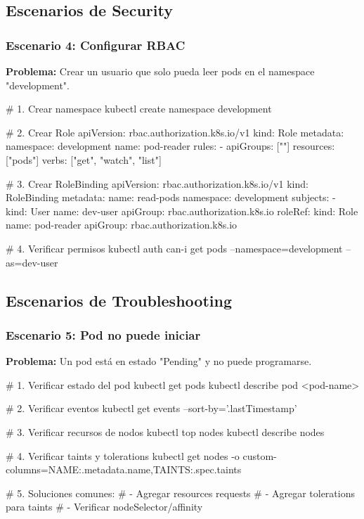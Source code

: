 \documentclass[11pt,a4paper]{article}
\begin{document}
\subsection{Escenarios de Security}

\subsubsection{Escenario 4: Configurar RBAC}

\textbf{Problema:} Crear un usuario que solo pueda leer pods en el namespace "development".

\begin{commandbox}
\# 1. Crear namespace
kubectl create namespace development

\# 2. Crear Role
apiVersion: rbac.authorization.k8s.io/v1
kind: Role
metadata:
  namespace: development
  name: pod-reader
rules:
- apiGroups: [""]
  resources: ["pods"]
  verbs: ["get", "watch", "list"]

\# 3. Crear RoleBinding
apiVersion: rbac.authorization.k8s.io/v1
kind: RoleBinding
metadata:
  name: read-pods
  namespace: development
subjects:
- kind: User
  name: dev-user
  apiGroup: rbac.authorization.k8s.io
roleRef:
  kind: Role
  name: pod-reader
  apiGroup: rbac.authorization.k8s.io

\# 4. Verificar permisos
kubectl auth can-i get pods --namespace=development --as=dev-user
\end{commandbox}

\subsection{Escenarios de Troubleshooting}

\subsubsection{Escenario 5: Pod no puede iniciar}

\textbf{Problema:} Un pod está en estado "Pending" y no puede programarse.

\begin{commandbox}
\# 1. Verificar estado del pod
kubectl get pods
kubectl describe pod <pod-name>

\# 2. Verificar eventos
kubectl get events --sort-by='.lastTimestamp'

\# 3. Verificar recursos de nodos
kubectl top nodes
kubectl describe nodes

\# 4. Verificar taints y tolerations
kubectl get nodes -o custom-columns=NAME:.metadata.name,TAINTS:.spec.taints

\# 5. Soluciones comunes:
\# - Agregar resources requests
\# - Agregar tolerations para taints
\# - Verificar nodeSelector/affinity
\end{commandbox}
\end{document}
